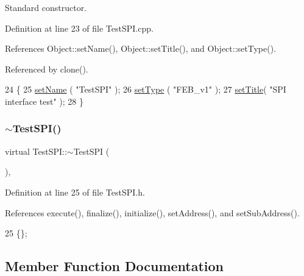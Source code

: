 Standard constructor. 



Definition at line 23 of file Test\+S\+P\+I.\+cpp.



References Object\+::set\+Name(), Object\+::set\+Title(), and Object\+::set\+Type().



Referenced by clone().


\begin{DoxyCode}
24 \{
25   \hyperlink{classObject_ae30fea75683c2d149b6b6d17c09ecd0c}{setName} ( \textcolor{stringliteral}{"TestSPI"} );
26   \hyperlink{classObject_aae534cc9d982bcb9b99fd505f2e103a5}{setType} ( \textcolor{stringliteral}{"FEB\_v1"} );
27   \hyperlink{classObject_a89557dbbad5bcaa02652f5d7fa35d20f}{setTitle}( \textcolor{stringliteral}{"SPI interface test"} );  
28 \}
\end{DoxyCode}
\mbox{\label{classTestSPI_af557282f685f8dcfb34fcc846bf91bce}} 
\subsubsection{\texorpdfstring{$\sim$\+Test\+S\+P\+I()}{~TestSPI()}}
{\footnotesize\ttfamily virtual Test\+S\+P\+I\+::$\sim$\+Test\+S\+PI (\begin{DoxyParamCaption}{ }\end{DoxyParamCaption})\hspace{0.3cm}{\ttfamily [inline]}, {\ttfamily [virtual]}}



Definition at line 25 of file Test\+S\+P\+I.\+h.



References execute(), finalize(), initialize(), set\+Address(), and set\+Sub\+Address().


\begin{DoxyCode}
25 \{\}; 
\end{DoxyCode}


\subsection{Member Function Documentation}
\mbox{\label{classTestSPI_afbca7dd9802d226ee1fec8475ff5f127}} 
